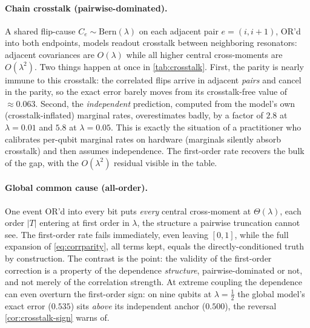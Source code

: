 \documentclass[a4paper,onecolumn,unpublished,nopdfoutputerror,allowtoday]{quantumarticle}
\numberwithin{equation}{section}
\theoremstyle{plain}
\theoremstyle{definition}
\theoremstyle{remark}
\begin{document}
\paragraph{Chain crosstalk (pairwise-dominated).} A shared flip-cause
$C_e\sim\mathrm{Bern}(\lambda)$ on each adjacent pair $e=(i,i+1)$, OR'd into
both endpoints, models readout crosstalk between neighboring resonators:
adjacent covariances are $O(\lambda)$ while all higher central cross-moments
are $O(\lambda^2)$. Two things happen at once in \cref{tab:crosstalk}. First,
the parity is nearly immune to this crosstalk: the correlated flips arrive in
adjacent \emph{pairs} and cancel in the parity, so the exact error barely moves
from its crosstalk-free value of $\approx0.063$. Second, the \emph{independent}
prediction, computed from the model's own (crosstalk-inflated) marginal rates,
overestimates badly, by a factor of $2.8$ at $\lambda=0.01$ and $5.8$ at
$\lambda=0.05$. This is exactly the situation of a practitioner who calibrates
per-qubit marginal rates on hardware (marginals silently absorb crosstalk) and
then assumes independence. The first-order rate recovers the bulk of the gap,
with the $O(\lambda^2)$ residual visible in the table.

\paragraph{Global common cause (all-order).} One event OR'd into every bit
puts \emph{every} central cross-moment at $\Theta(\lambda)$, each order $|T|$
entering at first order in $\lambda$, the structure a pairwise truncation
cannot see.
The first-order rate fails immediately, even leaving $[0,1]$, while the full
expansion of \cref{eq:corrparity}, all terms kept, equals the
directly-conditioned truth by construction. The contrast is the point: the
validity of the first-order correction is a property of the dependence
\emph{structure}, pairwise-dominated or not, and not merely of the correlation
strength. At extreme coupling the dependence can even overturn the first-order
sign: on nine qubits at $\lambda=\tfrac12$ the global model's exact error
($0.535$) sits \emph{above} its independent anchor ($0.500$), the reversal
\cref{cor:crosstalk-sign} warns of.
\end{document}

